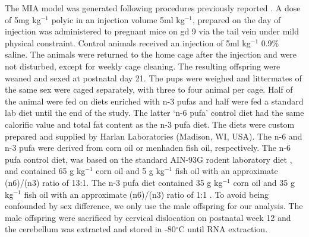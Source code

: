 The MIA model was generated following procedures previously reported \citep{Li2009c}. 
A dose of 5mg kg$^{-1}$ \gls{polyic} in an injection volume 5ml kg$^{-1}$, prepared on the day of injection was administered to pregnant mice on \gls{gd} 9 via the tail vein under mild physical constraint. 
Control animals received an injection of 5ml kg$^{-1}$ 0.9\% saline. 
The animals were returned to the home cage after the injection and were not disturbed, except for weekly cage cleaning.
The resulting offspring were weaned and sexed at postnatal day 21. 
The pups were weighed and littermates of the same sex were caged separately, with three to four animal per cage.
Half of the animal were fed on diets enriched with n-3 \glspl{pufa} and half were fed a standard  lab diet until the end of the study.
The latter `n-6 \gls{pufa}' control diet had the same calorific value and total fat content as the n-3 \gls{pufa} diet. 
The diets were custom prepared and supplied by Harlan Laboratories (Madison, WI, USA). 
The n-6 and n-3 \gls{pufa} were derived from corn oil or menhaden fish oil, respectively. 
The n-6 \gls{pufa} control diet, was based on the standard AIN-93G rodent laboratory diet \citep{Reeves1993}, and contained 65 g kg$^{-1}$ corn oil and 5 g kg$^{-1}$ fish oil with an approximate (n6)/(n3) ratio of 13:1. 
The n-3 \gls{pufa} diet contained 35 g kg$^{-1}$ corn oil and 35 g kg$^{-1}$ fish oil with an approximate (n6)/(n3) ratio of 1:1 \citep{Olivo2005}.
To avoid being confounded by sex difference, we only use the male offspring for our analysis.
The male offspring were sacrificed by cervical dislocation on postnatal week 12 and the cerebellum was extracted and stored in -80$^{\circ}$C until RNA extraction.


